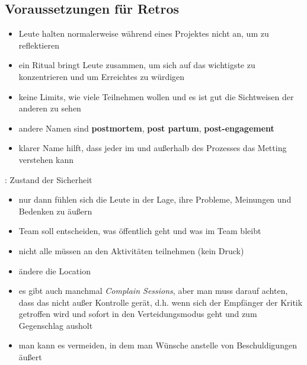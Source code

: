 \subsection{Voraussetzungen für Retros}

\begin{itemize}
  \item Leute halten normalerweise während eines Projektes nicht an, um zu reflektieren
  \item ein Ritual bringt Leute zusammen, um sich auf das wichtigste zu konzentrieren und um
    Erreichtes zu würdigen
  \item keine Limits, wie viele Teilnehmen wollen und es ist gut die Sichtweisen der anderen zu
    sehen
\end{itemize}



\begin{itemize}
  \item andere Namen sind \textbf{postmortem}, \textbf{post partum}, \textbf{post-engagement}
  \item klarer Name hilft, dass jeder im und außerhalb des Prozesses das Metting verstehen kann
\end{itemize}


: Zustand der Sicherheit

\begin{itemize}
  \item nur dann fühlen sich die Leute in der Lage, ihre Probleme, Meinungen und Bedenken zu äußern
  \item Team soll entscheiden, was öffentlich geht und was im Team bleibt
  \item nicht alle müssen an den Aktivitäten teilnehmen (kein Druck)
  \item ändere die Location
\end{itemize}




\begin{itemize}
  \item es gibt auch manchmal \textit{Complain Sessions}, aber man muss darauf achten, dass das nicht
    außer Kontrolle gerät, d.h. wenn sich der Empfänger der Kritik getroffen wird und sofort in den
    Verteidungsmodus geht und zum Gegenschlag ausholt
  \item man kann es vermeiden, in dem man Wünsche anstelle von Beschuldigungen äußert
\end{itemize}



